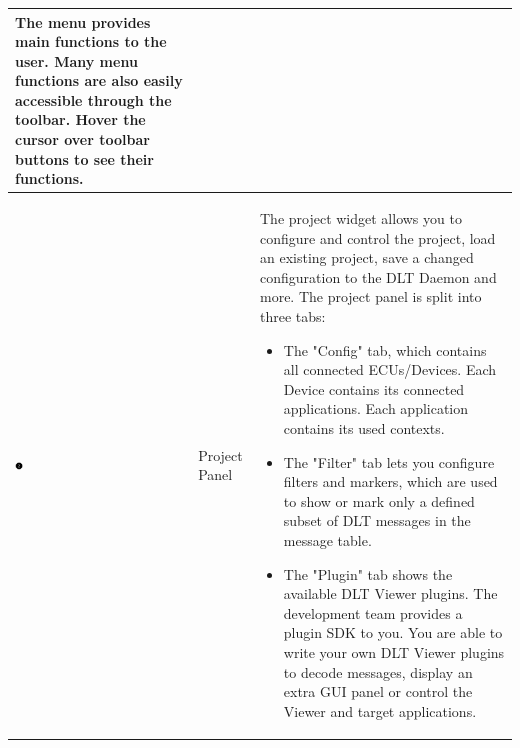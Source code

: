 \documentclass[a4paper,11pt]{article}
\begin{document}
\begin{longtable}{| l | m{3cm}  | m{11cm} |}
The menu provides main functions to the user. Many menu functions are also easily accessible through the toolbar.
Hover the cursor over toolbar buttons to see their functions. \\
   \hline

   \includegraphics[width=0.05\textwidth]{images/Mark2.png}
   &
    Project Panel
   &
   The project widget allows you to configure and control the project,
   load an existing project, save a changed configuration to the DLT Daemon and
   more. The project panel is split into three tabs:
   \begin{itemize}
    \item The "Config" tab, which contains all connected ECUs/Devices.
     Each Device contains its connected applications.
     Each application contains its used contexts.
    \item The "Filter" tab lets you configure filters and markers,
    which are used to show or
    mark only a defined subset of DLT messages in the message table.
    \item The "Plugin" tab shows the available DLT Viewer plugins. The development team provides a
    plugin SDK to you. You are able to write your own DLT Viewer plugins to decode
    messages, display an extra GUI panel or control the Viewer and target applications.
   \end{itemize}


\end{longtable}
\end{document}
